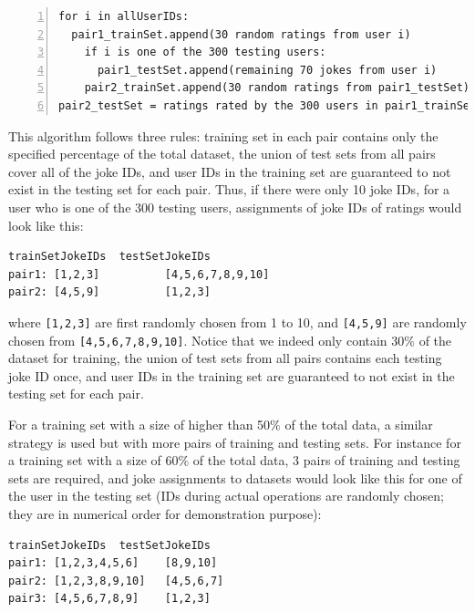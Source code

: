 \documentclass[12pt]{article}
\newcommand{\skipline}{\vspace{\baselineskip}}
\begin{document}
    \skipline

    \lstset{language = Python, upquote=true}
    \begin{lstlisting}[basicstyle=\footnotesize, numbers=left]
for i in allUserIDs:
  pair1_trainSet.append(30 random ratings from user i)
    if i is one of the 300 testing users:
      pair1_testSet.append(remaining 70 jokes from user i)
    pair2_trainSet.append(30 random ratings from pair1_testSet)
pair2_testSet = ratings rated by the 300 users in pair1_trainSet
    \end{lstlisting}



    \quad This algorithm follows three rules: training set in each pair contains only the specified percentage of the total dataset, the union of test sets from all pairs cover all of the joke IDs, and user IDs in the training set are guaranteed to not exist in the testing set for each pair. Thus, if there were only 10 joke IDs, for a user who is one of the 300 testing users, assignments of joke IDs of ratings would look like this:

    \lstset{language = R, upquote=true}
    \begin{lstlisting}[basicstyle=\small\tt]
       trainSetJokeIDs  testSetJokeIDs
pair1: [1,2,3]          [4,5,6,7,8,9,10]
pair2: [4,5,9]          [1,2,3]
    \end{lstlisting}

    where \texttt{[1,2,3]} are first randomly chosen from 1 to 10, and \texttt{[4,5,9]} are randomly chosen from \texttt{[4,5,6,7,8,9,10]}. Notice that we indeed only contain 30$\%$ of the dataset for training, the union of test sets from all pairs contains each testing joke ID once, and user IDs in the training set are guaranteed to not exist in the testing set for each pair.

    \quad For a training set with a size of higher than 50$\%$ of the total data, a similar strategy is used but with more pairs of training and testing sets. For instance for a training set with a size of $60\%$ of the total data, 3 pairs of training and testing sets are required, and joke assignments to datasets would look like this for one of the user in the testing set (IDs during actual operations are randomly chosen; they are in numerical order for demonstration purpose):

    \lstset{language = R, upquote=true}
    \begin{lstlisting}[basicstyle=\small\tt]
       trainSetJokeIDs  testSetJokeIDs
pair1: [1,2,3,4,5,6]    [8,9,10]
pair2: [1,2,3,8,9,10]   [4,5,6,7]
pair3: [4,5,6,7,8,9]    [1,2,3]
    \end{lstlisting}
\end{document}
